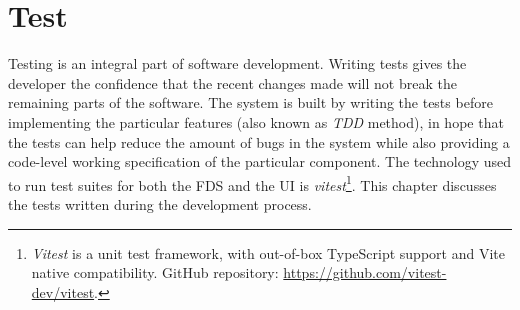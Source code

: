 \chapter{Test}

  Testing is an integral part of software development. Writing tests gives the developer the confidence that the recent changes made will not break the remaining parts of the software. The system is built by writing the tests before implementing the particular features (also known as \emph{TDD} method), in hope that the tests can help reduce the amount of bugs in the system while also providing a code-level working specification of the particular component. The technology used to run test suites for both the FDS and the UI is \emph{vitest}\footnote{\emph{Vitest} is a unit test framework, with out-of-box TypeScript support and Vite native compatibility. GitHub repository: \url{https://github.com/vitest-dev/vitest}.}. This chapter discusses the tests written during the development process.

  

  
